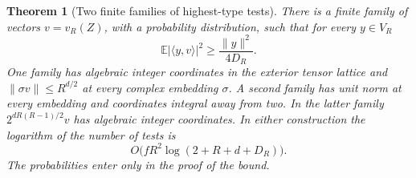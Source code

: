 \documentclass[a4paper,11pt]{article}
\newtheorem{theorem}[proposition]{Theorem}
\theoremstyle{definition}
\theoremstyle{remark}
\numberwithin{equation}{section}
\begin{document}
\begin{theorem}[Two finite families of highest-type tests]\leavevmode
\label{thm:frames311}
There is a finite family of vectors \(v=v_R(Z)\), with a
probability distribution, such that for every \(y\in V_R\)
\[
       {\mathbb E}|\langle y,v\rangle|^2
                         \ge \frac{\|y\|^2}{4D_R}.
\]
One family has algebraic integer coordinates in the exterior
tensor lattice and \(\|\sigma v\|\le R^{d/2}\) at every complex
embedding \(\sigma\). A second family has unit norm at every
embedding and coordinates integral away from two. In the latter
family \(2^{dR(R-1)/2}v\) has algebraic integer coordinates.
In either construction the logarithm of the number of tests is
\[
   O\big(fR^2\log(2+R+d+D_R)\big).
\]
The probabilities enter only in the proof of the bound.
\end{theorem}
\end{document}
